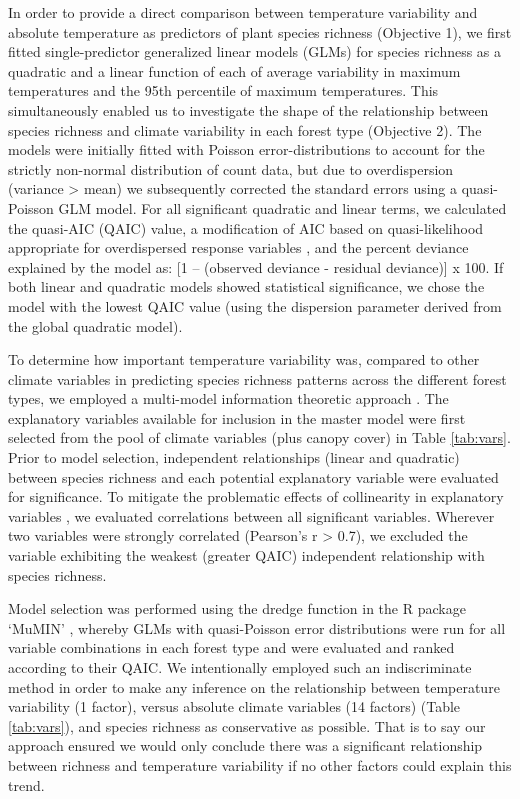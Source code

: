 In order to provide a direct comparison between temperature variability and absolute temperature as predictors of plant species richness (Objective 1), we first fitted single-predictor generalized linear models (GLMs) for species richness as a quadratic and a linear function of each of average variability in maximum temperatures and the 95th percentile of maximum temperatures. This simultaneously enabled us to investigate the shape of the relationship between species richness and climate variability in each forest type (Objective 2). The models were initially fitted with Poisson error-distributions to account for the strictly non-normal distribution of count data, but due to overdispersion (variance {\textgreater} mean) we subsequently corrected the standard errors using a quasi-Poisson GLM model. For all significant quadratic and linear terms, we calculated the quasi-AIC (QAIC) value, a modification of AIC based on quasi-likelihood appropriate for overdispersed response variables \citep{Burn}, and the percent deviance explained by the model as: [1 -- (observed deviance - residual deviance)] x 100. If both linear and quadratic models showed statistical significance, we chose the model with the lowest QAIC value (using the dispersion parameter derived from the global quadratic model). 

To determine how important temperature variability was, compared to other climate variables in predicting species richness patterns across the different forest types, we employed a multi-model information theoretic approach \citep{Burn}. The explanatory variables available for inclusion in the master model were first selected from the pool of climate variables (plus canopy cover) in Table \ref{tab:vars}. Prior to model selection, independent relationships (linear and quadratic) between species richness and each potential explanatory variable were evaluated for significance. To mitigate the problematic effects of collinearity in explanatory variables \citep{Dormann2012}, we evaluated correlations between all significant variables. Wherever two variables were strongly correlated (Pearson's {\textbar}r{\textbar} {\textgreater} 0.7), we excluded the variable exhibiting the weakest (greater QAIC) independent relationship with species richness. 

Model selection was performed using the dredge function in the R package `MuMIN' \citep{Barton2012}, whereby GLMs with quasi-Poisson error distributions were run for all variable combinations in each forest type and were evaluated and ranked according to their QAIC. We intentionally employed such an indiscriminate method in order to make any inference on the relationship between temperature variability (1 factor), versus absolute climate variables (14 factors) (Table \ref{tab:vars}), and species richness as conservative as possible. That is to say our approach ensured we would only conclude there was a significant relationship between richness and temperature variability if no other factors could explain this trend.

